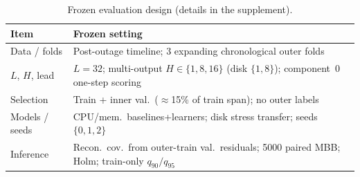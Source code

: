 \begin{table}[width=\columnwidth,pos=!t]
\centering
\caption{Frozen evaluation design (details in the supplement).}
\label{tab:experiment}
\begin{threeparttable}
\small
\begin{tabularx}{\tblwidth}{@{}l>{\raggedright\arraybackslash}X@{}}
\toprule
Item & Frozen setting \\
\midrule
Data / folds & Post-outage timeline; 3 expanding chronological outer folds \\
$L$, $H$, lead & $L{=}32$; multi-output $H{\in}\{1,8,16\}$ (disk $\{1,8\}$);
component~0 one-step scoring \\
Selection & Train + inner val.\ ($\approx$15\% of train span); no outer labels \\
Models / seeds & {CPU}/mem.\ baselines+learners; disk stress transfer;
seeds $\{0,1,2\}$ \\
Inference & Recon.\ cov.\ from outer-train val.\ residuals; 5000 paired {MBB};
Holm; train-only $q_{90}/q_{95}$ \\
\bottomrule
\end{tabularx}
\end{threeparttable}
\end{table}
